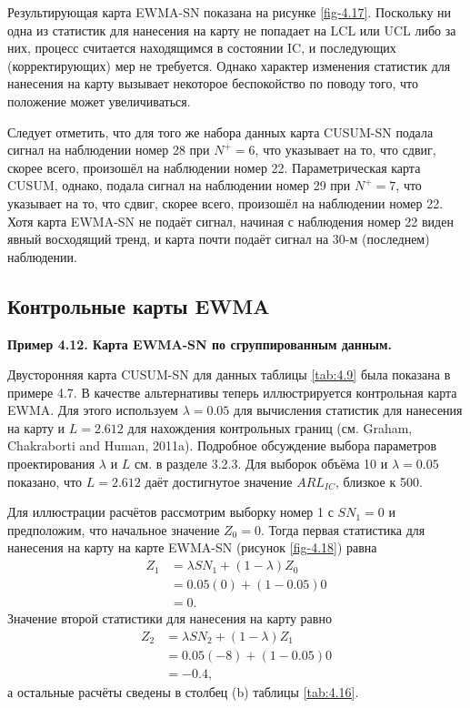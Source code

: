 Результирующая карта EWMA-SN показана на рисунке \ref{fig-4.17}. Поскольку ни одна из статистик для нанесения на карту не попадает на LCL или UCL либо за них, процесс считается находящимся в состоянии IC, и последующих (корректирующих) мер не требуется. Однако характер изменения статистик для нанесения на карту вызывает некоторое беспокойство по поводу того, что положение может увеличиваться.

Следует отметить, что для того же набора данных карта CUSUM-SN подала сигнал на наблюдении номер 28 при \(N^+ = 6\), что указывает на то, что сдвиг, скорее всего, произошёл на наблюдении номер 22. Параметрическая карта CUSUM, однако, подала сигнал на наблюдении номер 29 при \(N^+ = 7\), что указывает на то, что сдвиг, скорее всего, произошёл на наблюдении номер 22. Хотя карта EWMA-SN не подаёт сигнал, начиная с наблюдения номер 22 виден явный восходящий тренд, и карта почти подаёт сигнал на 30-м (последнем) наблюдении.

\subsection{Контрольные карты EWMA}

\noindent\textbf{Пример 4.12. Карта EWMA-SN по сгруппированным данным.}

Двусторонняя карта CUSUM-SN для данных таблицы \ref{tab:4.9} была показана в примере 4.7. В качестве альтернативы теперь иллюстрируется контрольная карта EWMA. Для этого используем \(\lambda = 0.05\) для вычисления статистик для нанесения на карту и \(L = 2.612\) для нахождения контрольных границ (см. Graham, Chakraborti and Human, 2011a). Подробное обсуждение выбора параметров проектирования \(\lambda\) и \(L\) см. в разделе 3.2.3. Для выборок объёма 10 и \(\lambda = 0.05\) показано, что \(L = 2.612\) даёт достигнутое значение \(ARL_{IC}\), близкое к 500.

Для иллюстрации расчётов рассмотрим выборку номер 1 с \(SN_1 = 0\) и предположим, что начальное значение \(Z_0 = 0\). Тогда первая статистика для нанесения на карту на карте EWMA-SN (рисунок \ref{fig-4.18}) равна
\begin{align*}
	Z_1 &= \lambda SN_1 + (1 - \lambda)Z_0 \\
	    &= 0.05(0) + (1 - 0.05)0 \\
	    &= 0.
\end{align*}
Значение второй статистики для нанесения на карту равно
\begin{align*}
	Z_2 &= \lambda SN_2 + (1 - \lambda)Z_1 \\
	    &= 0.05(-8) + (1 - 0.05)0 \\
	    &= -0.4,
\end{align*}
а остальные расчёты сведены в столбец (b) таблицы \ref{tab:4.16}.


